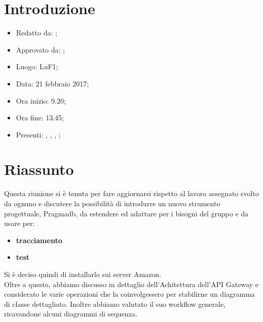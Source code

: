 \section{Introduzione}

	\begin{itemize}
		\item Redatto da: \MC;
		\item Approvato da: \AS;
		\item Luogo: LuF1;
		\item Data: 21 febbraio 2017;
		\item Ora inizio: 9.20;
		\item Ora fine: 13.45;
		\item Presenti: \DAN, \DS, \MC, \NS;		
	\end{itemize}

\section{Riassunto}
Questa riunione si è tenuta per fare aggiornarsi rispetto al lavoro assegnato svolto da ognuno e discutere la possibilit\`{a} di introdurre un nuovo strumento progettuale, Pragmadb, da estendere ed adattare per i bisogni del gruppo e da usare per:
\begin{itemize}
	\item \textbf{tracciamento}
	\item \textbf{test}
\end{itemize}

Si \`{e} deciso quindi di installarlo sui server Amazon. \\

Oltre a questo, abbiamo discusso in dettaglio dell'Achitettura dell'API Gateway e considerato le varie operazioni che la coinvolgessero per stabilirne un diagramma di classe dettagliato. Inoltre abbiamo valutato il suo workflow generale, ricavandone alcuni diagrammi di sequenza. 

